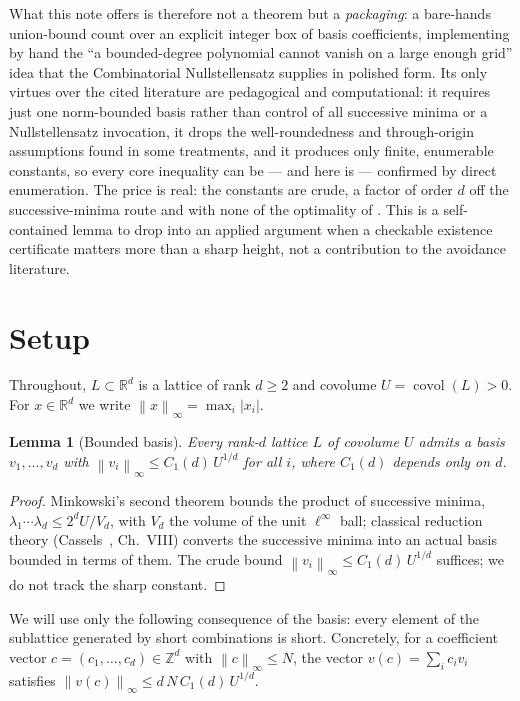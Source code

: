 \documentclass[11pt]{article}
\newtheorem{lemma}{Lemma}
\theoremstyle{definition}
\newcommand{\Z}{\mathbb{Z}}
\newcommand{\R}{\mathbb{R}}
\newcommand{\norm}[1]{\left\lVert #1 \right\rVert}
\newcommand{\abs}[1]{\left\lvert #1 \right\rvert}
\DeclareMathOperator{\covol}{covol}
\begin{document}
What this note offers is therefore not a theorem but a \emph{packaging}: a bare-hands
union-bound count over an explicit integer box of basis coefficients, implementing by
hand the ``a bounded-degree polynomial cannot vanish on a large enough grid'' idea that
the Combinatorial Nullstellensatz supplies in polished form. Its only virtues over the
cited literature are pedagogical and computational: it requires just one norm-bounded
basis rather than control of all successive minima or a Nullstellensatz invocation, it
drops the well-roundedness and through-origin assumptions found in some treatments, and
it produces only finite, enumerable constants, so every core inequality can be --- and
here is --- confirmed by direct enumeration. The price is real: the constants are crude,
a factor of order $d$ off the successive-minima route and with none of the optimality of
\cite{fuk2010}. This is a self-contained lemma to drop into an applied argument when a
checkable existence certificate matters more than a sharp height, not a contribution to
the avoidance literature.

\section{Setup}

Throughout, $L \subset \R^d$ is a lattice of rank $d \ge 2$ and covolume
$U = \covol(L) > 0$. For $x \in \R^d$ we write $\norm{x}_\infty = \max_i \abs{x_i}$.

\begin{lemma}[Bounded basis]\label{lem:basis}
Every rank-$d$ lattice $L$ of covolume $U$ admits a basis $v_1,\dots,v_d$ with
$\norm{v_i}_\infty \le C_1(d)\,U^{1/d}$ for all $i$, where $C_1(d)$ depends only on $d$.
\end{lemma}

\begin{proof}
Minkowski's second theorem bounds the product of successive minima,
$\lambda_1 \cdots \lambda_d \le 2^d U / V_d$, with $V_d$ the volume of the unit
$\ell^\infty$ ball; classical reduction theory (Cassels~\cite{cassels}, Ch.~VIII)
converts the successive minima into an actual basis bounded in terms of them.
The crude bound $\norm{v_i}_\infty \le C_1(d)\,U^{1/d}$ suffices; we do not track the
sharp constant.
\end{proof}

We will use only the following consequence of the basis: every element of the
sublattice generated by short combinations is short. Concretely, for a coefficient
vector $c = (c_1,\dots,c_d) \in \Z^d$ with $\norm{c}_\infty \le N$, the vector
$v(c) = \sum_i c_i v_i$ satisfies $\norm{v(c)}_\infty \le d\,N\,C_1(d)\,U^{1/d}$.
\end{document}
